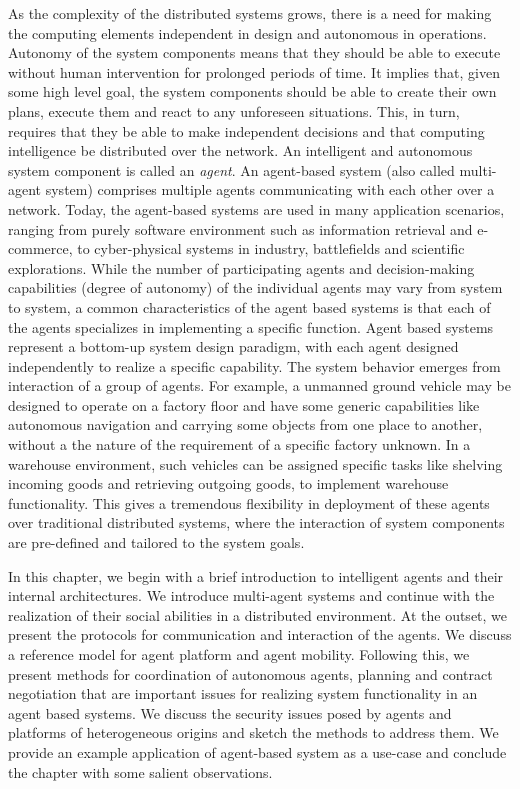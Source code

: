 
 
As the complexity of the distributed systems grows, there is a need for making the computing elements independent in design and
autonomous in operations. Autonomy of the system components means that they should be able to execute without human intervention
for prolonged periods of time. It implies that, given some high level goal, the system components should be able to create their 
own plans, execute them and react to any unforeseen situations. This, in turn, requires that they be able to make independent 
decisions and that computing intelligence be distributed over the network. An intelligent and autonomous system component is 
called an {\em agent}. An agent-based system (also called multi-agent system) comprises multiple agents communicating with each 
other over a network. 
%
Today, the agent-based systems are used in many application scenarios, ranging from purely software environment such as information 
retrieval and e-commerce, to cyber-physical systems in industry, battlefields and scientific explorations. While the number of 
participating agents and decision-making capabilities (degree of autonomy) of the individual agents may vary from system to system, 
a common characteristics of the agent based systems is that each of the agents specializes in implementing a specific function. 
Agent based systems represent a bottom-up system design paradigm, with each agent designed independently to realize a specific 
capability. The system behavior emerges from interaction of a group of agents. 
For example, a unmanned ground vehicle may be designed to operate on a factory floor and have some generic capabilities like
autonomous navigation and carrying some objects from one place to another, without a the nature of the requirement of a specific 
factory unknown. In a warehouse environment, such vehicles can be assigned specific tasks like shelving incoming goods and
retrieving outgoing goods, to implement warehouse functionality. This gives a tremendous flexibility in deployment of these agents 
over traditional distributed systems, where the interaction of system components are pre-defined and tailored to the system goals. 

In this chapter, we begin with a brief introduction to intelligent agents and their internal architectures. We introduce multi-agent
systems and continue with the realization of their social abilities in a distributed environment. At the outset, we present the 
protocols for communication and interaction of the agents. We discuss a reference model for agent platform and agent mobility.
Following this, we present methods for coordination of autonomous agents, planning and contract negotiation that are important
issues for realizing system functionality in an agent based systems. We discuss the security issues posed by agents and platforms
of heterogeneous origins and sketch the methods to address them. We provide an example application of agent-based system as a use-case
and conclude the chapter with some salient observations.










